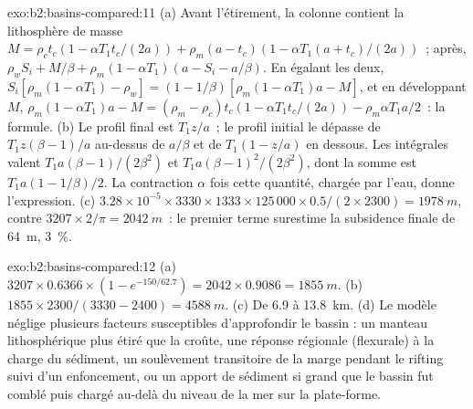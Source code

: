 \begin{solution}{exo:b2:basins-compared:11}
(a) Avant l'étirement, la colonne contient la lithosphère de masse $M = \rho_c t_c(1 - \alpha T_1
t_c/(2a)) + \rho_m(a - t_c)(1 - \alpha T_1(a + t_c)/(2a))$~; après, $\rho_w S_i + M/\beta +
\rho_m(1 - \alpha T_1)(a - S_i - a/\beta)$. En égalant les deux, $S_i[\rho_m(1 - \alpha T_1) - \rho_w] =
(1 - 1/\beta)[\rho_m(1 - \alpha T_1)a - M]$, et en développant $M$, $\rho_m(1 - \alpha T_1)a - M =
(\rho_m - \rho_c)t_c(1 - \alpha T_1 t_c/(2a)) - \rho_m\alpha T_1 a/2$~: la formule. (b) Le profil final est $T_1 z/a$~; le profil initial le dépasse
de $T_1 z(\beta - 1)/a$ au-dessus de $a/\beta$ et de $T_1(1 - z/a)$ en dessous. Les intégrales valent $T_1
a(\beta - 1)/(2\beta^2)$ et $T_1 a(\beta - 1)^2/(2\beta^2)$, dont la somme est $T_1 a(1 - 1/\beta)/2$.
La contraction $\alpha$ fois cette quantité, chargée par l'eau, donne l'expression. (c) $3.28\times10^{-5}
\times3330\times1333\times125\,000\times0.5/(2\times2300) = \qty{1978}{m}$, contre $3207\times
2/\pi = \qty{2042}{m}$~: le premier terme surestime la subsidence finale de \qty{64}{m},
\qty{3}{\percent}.
\end{solution}

\begin{solution}{exo:b2:basins-compared:12}
(a) $3207\times0.6366\times(1 - e^{-150/62.7}) = 2042\times0.9086 = \qty{1855}{m}$. (b) $1855\times
2300/(3330 - 2400) = \qty{4588}{m}$. (c) De 6.9 à \qty{13.8}{km}. (d) Le modèle néglige plusieurs
facteurs susceptibles d'approfondir le bassin : un manteau lithosphérique plus étiré que la croûte, une réponse
régionale (flexurale) à la charge du sédiment, un soulèvement transitoire de la marge pendant le rifting
suivi d'un enfoncement, ou un apport de sédiment si grand que le bassin fut comblé puis chargé
au-delà du niveau de la mer sur la plate-forme.
\end{solution}


